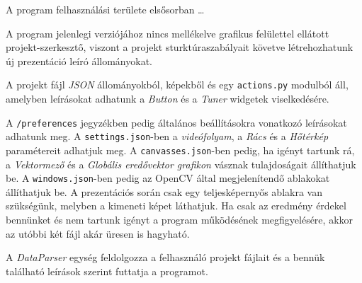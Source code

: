

A program felhasználási területe elsősorban \ldots

A program jelenlegi verziójához nincs mellékelve grafikus felülettel ellátott projekt-szerkesztő, viszont a projekt sturktúraszabályait követve létrehozhatunk új prezentáció leíró állományokat.

\bigskip


\bigskip

\noindent A projekt fájl \textit{JSON} állományokból, képekből és egy \texttt{actions.py} modulból áll, amelyben leírásokat adhatunk a \textit{Button} és a \textit{Tuner} widgetek viselkedésére.

A \texttt{/preferences} jegyzékben pedig általános beállításokra vonatkozó leírásokat adhatunk meg. A \texttt{settings.json}-ben a \textit{videófolyam}, a \textit{Rács} és a \textit{Hőtérkép} paramétereit adhatjuk meg. A
\texttt{canvasses.json}-ben pedig, ha igényt tartunk rá, a \textit{Vektormező} és a \textit{Globális eredővektor grafikon} vásznak tulajdoságait állíthatjuk be.
A \texttt{windows.json}-ben pedig az OpenCV által megjelenítendő ablakokat állíthatjuk be. A prezentációs során csak egy teljesképernyős ablakra van szükségünk, melyben a kimeneti képet láthatjuk. Ha csak az eredmény érdekel bennünket és nem tartunk igényt a program működésének megfigyelésére, akkor az utóbbi két fájl akár üresen is hagyható.

A \textit{DataParser} egység feldolgozza a felhasználó projekt fájlait és a bennük található leírások szerint futtatja a programot.


